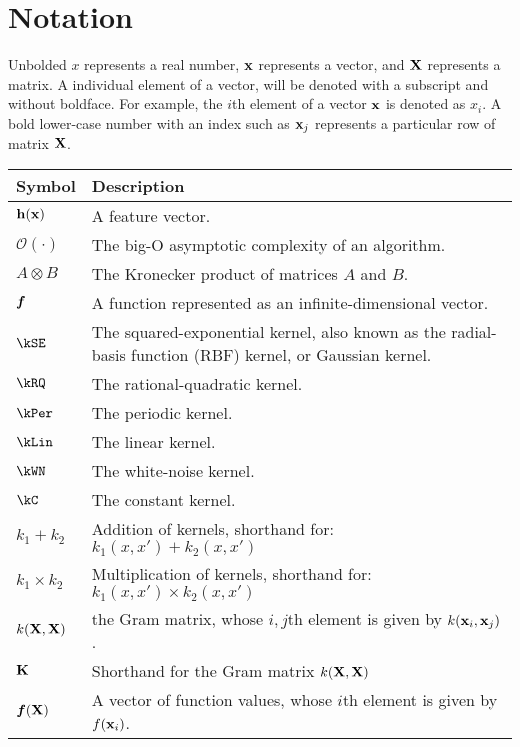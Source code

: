 
\inbpdocument

\chapter*{Notation}
\label{ch:notation}


Unbolded $x$ represents a real number, ${\bf{x}}$ represents a vector, and $\mathbf{X}$ represents a matrix.
A individual element of a vector, will be denoted with a subscript and without boldface.
For example, the $i$th element of a vector ${\bf{x}}$ is denoted as $x_i$.
A bold lower-case number with an index such as ${\bf{x}}_j$ represents a particular row of matrix $\mathbf{X}$.

\vspace{1cm}

\begin{tabular}{lm{12cm}}
Symbol \quad     & Description \\
\hline
${\bf{h}}({\bf{x}})$       & A feature vector. \\
$\mathcal{O}(\cdot)$ & The big-O asymptotic complexity of an algorithm. \\
$A \otimes B$ & The Kronecker product of matrices $A$ and $B$. \\
$\boldsymbol{f}$ & A function represented as an infinite-dimensional vector. \\
$\kSE$ & The squared-exponential kernel, also known as the radial-basis function (RBF) kernel, or Gaussian kernel. \\
$\kRQ$ & The rational-quadratic kernel. \\
$\kPer$ & The periodic kernel. \\
$\kLin$ & The linear kernel. \\
$\kWN$ & The white-noise kernel. \\
$\kC$ & The constant kernel. \\
$k_1 + k_2$ & Addition of kernels, shorthand for: $k_1(x,x') + k_2(x,x')$ \\
$k_1 \times k_2$& Multiplication of kernels, shorthand for: $k_1(x,x') \times k_2(x,x')$ \\
$k(\mathbf{X}, \mathbf{X})$ & the Gram matrix, whose $i,j$th element is given by $k({\bf{x}}_i, {\bf{x}}_j)$. \\
$\mathbf{K}$ & Shorthand for the Gram matrix $k(\mathbf{X}, \mathbf{X})$ \\
$\boldsymbol{f}(\mathbf{X})$ & A vector of function values, whose $i$th element is given by $f({\bf{x}}_i)$.
\end{tabular}

\outbpdocument{
}


